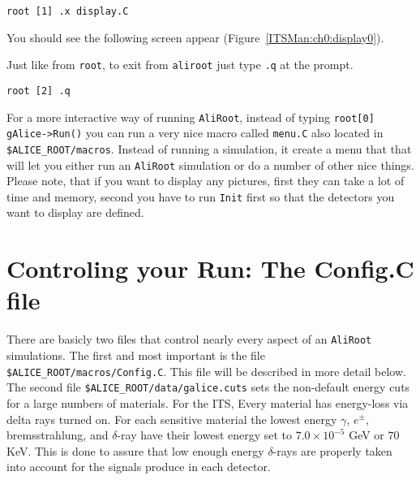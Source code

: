 \scriptsize
\begin{verbatim}
root [1] .x display.C
\end{verbatim}
\normalsize

You should see the following screen appear (Figure~\ref{ITSMan:ch0:display0}).

\begin{figure*}[htbp]
  \begin{center}
    \leavevmode
    \caption{Typical ALICE hit display output. Note that the geometry being
    displayed is a simplified geometry, not that used by the AliRoot
    simulation.}
    \label{ITSMan:ch0:display0}
  \end{center}
\end{figure*}

Just like from \texttt{root}, to exit from \texttt{aliroot} just type
\texttt{.q} at the prompt.

\scriptsize
\begin{verbatim}
root [2] .q
\end{verbatim}
\normalsize

For a more interactive way of running \texttt{AliRoot}, instead of typing
\texttt{root[0] gAlice->Run()} you can run a very nice macro called
\texttt{menu.C} also located in \texttt{\$ALICE\_ROOT/macros}. Instead of
running a simulation, it create a menu that that will let you either run an
\texttt{AliRoot} simulation or do a number of other nice things. Please note,
that if you want to display any pictures, first they can take a lot of time and
memory, second you have to run \texttt{Init} first so that the detectors you
want to display are defined.


\section*{Controling your Run: The Config.C file}

There are basicly two files that control nearly every aspect of an
\texttt{AliRoot} simulations. The first and most important is the file
\texttt{\$ALICE\_ROOT/macros/Config.C}. This file will be described in more
detail below. The second file \texttt{\$ALICE\_ROOT/data/galice.cuts} sets the
non-default energy cuts for a large numbers of materials. For the ITS, Every
material has energy-loss via delta rays turned on. For each sensitive material
the lowest energy $\gamma$, $e^{\pm}$, bremsstrahlung, and $\delta$-ray have
their lowest energy set to $7.0\times 10^{-5}$ GeV or $70$ KeV. This is done to
assure that low enough energy $\delta$-rays are properly taken into account for
the signals produce in each detector.

